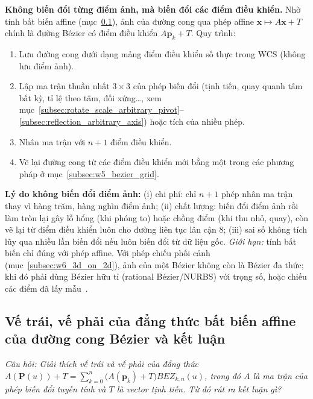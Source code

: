 \textbf{Không biến đổi từng điểm ảnh, mà biến đổi các điểm điều khiển.} Nhờ tính bất biến affine (mục~\ref{subsec:w5_affine}), ảnh của đường cong qua phép affine $\mathbf{x} \mapsto A\mathbf{x} + T$ chính là đường Bézier có điểm điều khiển $A\mathbf{p}_k + T$. Quy trình:
\begin{enumerate}
    \item Lưu đường cong dưới dạng mảng điểm điều khiển số thực trong WCS (không lưu điểm ảnh).
    \item Lập ma trận thuần nhất $3 \times 3$ của phép biến đổi (tịnh tiến, quay quanh tâm bất kỳ, tỉ lệ theo tâm, đối xứng\ldots{}, xem mục~\ref{subsec:rotate_scale_arbitrary_pivot}--\ref{subsec:reflection_arbitrary_axis}) hoặc tích của nhiều phép.
    \item Nhân ma trận với $n + 1$ điểm điều khiển.
    \item Vẽ lại đường cong từ các điểm điều khiển mới bằng một trong các phương pháp ở mục~\ref{subsec:w5_bezier_grid}.
\end{enumerate}
\textbf{Lý do không biến đổi điểm ảnh:} (i) chi phí: chỉ $n + 1$ phép nhân ma trận thay vì hàng trăm, hàng nghìn điểm ảnh; (ii) chất lượng: biến đổi điểm ảnh rồi làm tròn lại gây lỗ hổng (khi phóng to) hoặc chồng điểm (khi thu nhỏ, quay), còn vẽ lại từ điểm điều khiển luôn cho đường liên tục lân cận 8; (iii) sai số không tích lũy qua nhiều lần biến đổi nếu luôn biến đổi từ dữ liệu gốc. \emph{Giới hạn:} tính bất biến chỉ đúng với phép affine. Với phép chiếu phối cảnh (mục~\ref{subsec:w6_3d_on_2d}), ảnh của một Bézier không còn là Bézier đa thức; khi đó phải dùng Bézier hữu tỉ (rational Bézier/NURBS) với trọng số, hoặc chiếu các điểm đã lấy mẫu~\citep{farin2002curves}.

\subsection{Vế trái, vế phải của đẳng thức bất biến affine của đường cong Bézier và kết luận}
\label{subsec:w5_affine}

\textit{Câu hỏi: Giải thích vế trái và vế phải của đẳng thức $A(\mathbf{P}(u)) + T = \sum_{k=0}^{n} \big(A(\mathbf{p}_k) + T\big) BEZ_{k,n}(u)$, trong đó $A$ là ma trận của phép biến đổi tuyến tính và $T$ là vector tịnh tiến. Từ đó rút ra kết luận gì?}

